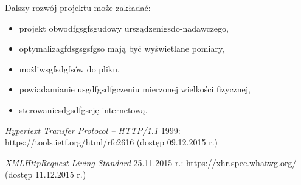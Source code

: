 \documentclass{mgr}
\begin{document}
Dalszy rozwój projektu może zakładać:
\begin{itemize}
\item projekt obwodfgsgfsgudowy ursządzenigsdo-nadawczego,
\item optymalizagfdsgsgsfgso mają być
wyświetlane pomiary,
\item możliwsgfsdgfsów do pliku.
\item powiadamianie usgdfgsdfgczeniu mierzonej wielkości
fizycznej,
\item sterowaniesdgsdfgscję internetową.
\end{itemize}
  \begin{thebibliography}{9}

   {\em Hypertext Transfer Protocol -- HTTP/1.1} 1999: 
  https://tools.ietf.org/html/rfc2616 (dostęp 09.12.2015 r.)

   {\em XMLHttpRequest Living Standard} 25.11.2015 r.: 
  https://xhr.spec.whatwg.org/ (dostęp 11.12.2015 r.)

  \end{thebibliography}

\listoffigures
{}
 \listoftables
{}
 \lstlistoflistings
\end{document}
